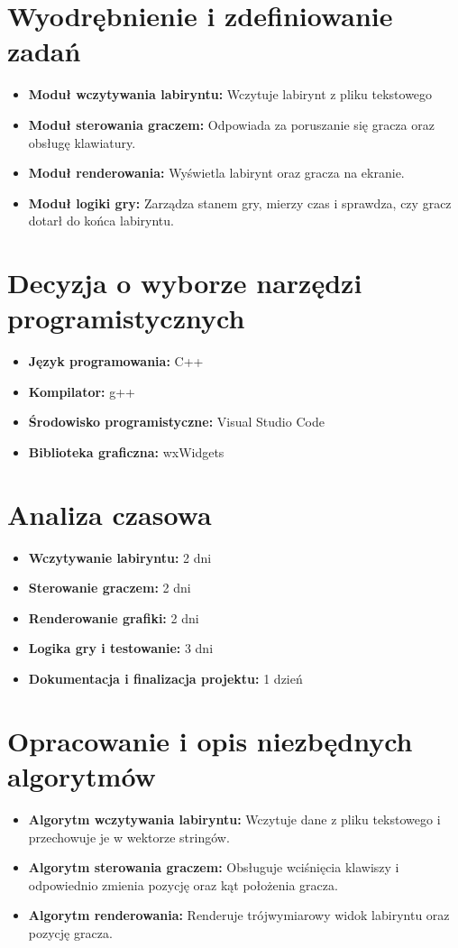 \documentclass{article}
\begin{document}
\section{Wyodrębnienie i zdefiniowanie zadań}
\begin{itemize}
    \item \textbf{Moduł wczytywania labiryntu:} Wczytuje labirynt z pliku tekstowego
    \item \textbf{Moduł sterowania graczem: } Odpowiada za poruszanie się gracza oraz obsługę klawiatury.
    \item \textbf{Moduł renderowania: } Wyświetla labirynt oraz gracza na ekranie.
    \item \textbf{Moduł logiki gry: } Zarządza stanem gry, mierzy czas i sprawdza, czy gracz dotarł do końca labiryntu.
\end{itemize}

\section{Decyzja o wyborze narzędzi programistycznych}
\begin{itemize}
    \item \textbf{Język programowania:} C++
    \item \textbf{Kompilator:} g++
    \item \textbf{Środowisko programistyczne:} Visual Studio Code
    \item \textbf{Biblioteka graficzna:} wxWidgets
\end{itemize}

\section{Analiza czasowa}
\begin{itemize}
    \item \textbf{Wczytywanie labiryntu:} 2 dni
    \item \textbf{Sterowanie graczem:} 2 dni
    \item \textbf{Renderowanie grafiki:} 2 dni
    \item \textbf{Logika gry i testowanie:} 3 dni
    \item \textbf{Dokumentacja i finalizacja projektu:} 1 dzień
\end{itemize}

\section{Opracowanie i opis niezbędnych algorytmów}
\begin{itemize}
    \item \textbf{Algorytm wczytywania labiryntu:} Wczytuje dane z pliku tekstowego i przechowuje je w wektorze stringów.
    \item \textbf{Algorytm sterowania graczem:} Obsługuje wciśnięcia klawiszy i odpowiednio zmienia pozycję oraz kąt położenia gracza.
    \item \textbf{Algorytm renderowania:} Renderuje trójwymiarowy widok labiryntu oraz pozycję gracza.
\end{itemize}
\end{document}
